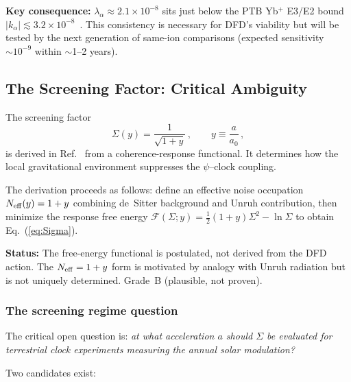 \documentclass[twocolumn,showpacs,preprintnumbers,amsmath,amssymb,prd]{revtex4-2}
\newcommand{\kalpha}{k_\alpha}
\begin{document}
\textbf{Key consequence:} $\lambda_\alpha \approx 2.1 \times 10^{-8}$
sits just below the PTB Yb$^+$ E3/E2 bound
$|\kalpha| \lesssim 3.2 \times 10^{-8}$~\cite{Lange2021}.
This consistency is necessary for DFD's viability but will be
tested by the next generation of same-ion comparisons (expected
sensitivity $\sim 10^{-9}$ within $\sim$1--2 years).

\subsection{The Screening Factor: Critical Ambiguity}\label{sec:screening}

The screening factor
\begin{equation}\label{eq:Sigma}
\Sigma(y) = \frac{1}{\sqrt{1 + y}}\,,
\qquad y \equiv \frac{a}{a_0}\,,
\end{equation}
is derived in Ref.~\cite[Eq.~(9.14)]{Alcock2025_DFD_v32} from a
coherence-response functional.  It determines how the local
gravitational environment suppresses the $\psi$--clock coupling.

The derivation proceeds as follows: define an effective noise
occupation $N_{\rm eff}(y) = 1 + y$ combining de~Sitter background
and Unruh contribution, then minimize the response free energy
$\mathcal{F}(\Sigma; y) = \frac{1}{2}(1+y)\Sigma^2 - \ln\Sigma$
to obtain Eq.~(\ref{eq:Sigma}).

\textbf{Status:} The free-energy functional is postulated, not
derived from the DFD action.  The $N_{\rm eff} = 1 + y$ form is
motivated by analogy with Unruh radiation but is not uniquely
determined.  Grade~B (plausible, not proven).

\subsubsection{The screening regime question}\label{sec:regime}

The critical open question is: \emph{at what acceleration $a$ should
$\Sigma$ be evaluated for terrestrial clock experiments measuring
the annual solar modulation?}

Two candidates exist:
\end{document}
